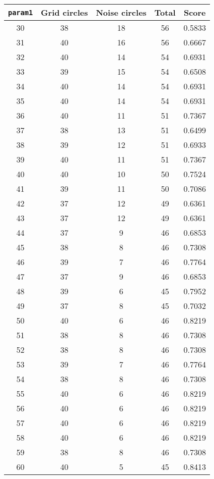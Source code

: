 \documentclass[letterpaper, 12pt]{article}
\begin{document}
\begin{longtable}{|c|c|c|c|c|}
\hline
\textbf{\texttt{param1}} & \textbf{Grid circles} & \textbf{Noise circles} & \textbf{Total} & \textbf{Score} \\
\hline
30 & 38 & 18 & 56 & 0.5833 \\
\hline
31 & 40 & 16 & 56 & 0.6667 \\
\hline
32 & 40 & 14 & 54 & 0.6931 \\
\hline
33 & 39 & 15 & 54 & 0.6508 \\
\hline
34 & 40 & 14 & 54 & 0.6931 \\
\hline
35 & 40 & 14 & 54 & 0.6931 \\
\hline
36 & 40 & 11 & 51 & 0.7367 \\
\hline
37 & 38 & 13 & 51 & 0.6499 \\
\hline
38 & 39 & 12 & 51 & 0.6933 \\
\hline
39 & 40 & 11 & 51 & 0.7367 \\
\hline
40 & 40 & 10 & 50 & 0.7524 \\
\hline
41 & 39 & 11 & 50 & 0.7086 \\
\hline
42 & 37 & 12 & 49 & 0.6361 \\
\hline
43 & 37 & 12 & 49 & 0.6361 \\
\hline
44 & 37 & 9 & 46 & 0.6853 \\
\hline
45 & 38 & 8 & 46 & 0.7308 \\
\hline
46 & 39 & 7 & 46 & 0.7764 \\
\hline
47 & 37 & 9 & 46 & 0.6853 \\
\hline
48 & 39 & 6 & 45 & 0.7952 \\
\hline
49 & 37 & 8 & 45 & 0.7032 \\
\hline
50 & 40 & 6 & 46 & 0.8219 \\
\hline
51 & 38 & 8 & 46 & 0.7308 \\
\hline
52 & 38 & 8 & 46 & 0.7308 \\
\hline
53 & 39 & 7 & 46 & 0.7764 \\
\hline
54 & 38 & 8 & 46 & 0.7308 \\
\hline
55 & 40 & 6 & 46 & 0.8219 \\
\hline
56 & 40 & 6 & 46 & 0.8219 \\
\hline
57 & 40 & 6 & 46 & 0.8219 \\
\hline
58 & 40 & 6 & 46 & 0.8219 \\
\hline
59 & 38 & 8 & 46 & 0.7308 \\
\hline
60 & 40 & 5 & 45 & 0.8413 \\
\hline

\end{longtable}
\end{document}
